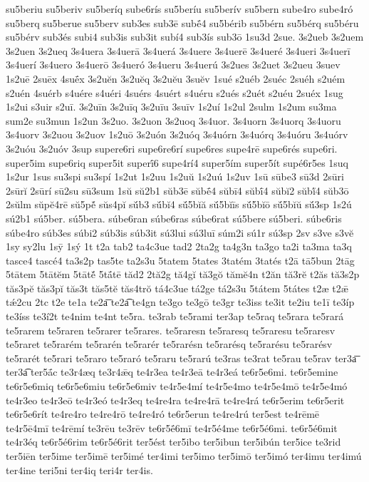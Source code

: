 {su5beriu
su5beriv
su5beríq
sube6rís
su5beríu
su5berív
su5bern
sube4ro
sube4ró
su5berq
su5berue
su5berv
sub3es
sub3ē
subḗ4
su5bérib
su5bérn
su5bérq
su5béru
su5bérv
sub3és
subi4
sub3is
sub3it
subí4
sub3ís
sub3ō
1su3d
2sue.
3s2ueb
3s2uem
3s2uen
3s2ueq
3s4uera
3s4uerā
3s4uerá
3s4uere
3s4uerē
3s4ueré
3s4ueri
3s4uerī
3s4uerí
3s4uero
3s4uerō
3s4ueró
3s4ueru
3s4uerú
3s2ues
3s2uet
3s2ueu
3suev
1s2uē
2suēx
4suḗx
3s2uĕn
3s2uĕq
3s2uĕu
3suĕv
1sué
s2uéb
2suéc
2suéh
s2uém
s2uén
4suérb
s4uére
s4uéri
4suérs
4suért
s4uéru
s2ués
s2uét
s2uéu
2suéx
1sug
1s2ui
s3uir
s2uī.
3s2uīn
3s2uīq
3s2uīu
3suīv
1s2uí
1s2ul
2sulm
1s2um
su3ma
sum2e
su3mun
1s2un
3s2uo.
3s2uon
3s2uoq
3s4uor.
3s4uorn
3s4uorq
3s4uoru
3s4uorv
3s2uou
3s2uov
1s2uō
3s2uón
3s2uóq
3s4uórn
3s4uórq
3s4uóru
3s4uórv
3s2uóu
3s2uóv
3sup
supere6ri
supe6re6rí
supe6res
supe4rē
supe6rés
supe6ri.
super5im
supe6riq
super5it
superī́6
supe4rí4
super5ím
super5ít
supé6r5es
1suq
1s2ur
1sus
su3spi
su3spí
1s2ut
1s2uu
1s2uŭ
1s2uú
1s2uv
1sū
sūbe3
sū3d
2sūri
2sūrĭ
2sūrí
sū2su
sū3sum
1sŭ
sŭ2b1
sŭb3ē
sŭbḗ4
sŭbī4
sŭbī́4
sŭbĭ2
sŭbĭ́4
sŭb3ō
2sŭlm
sŭpĕ4rē
sŭ5pĕ́
sŭs4pĭ
sŭ́b3
sŭ́bĭ4
sŭ́5bĭă
sŭ́5bĭīs
sŭ́5bĭō
sŭ́5bĭŭ
sŭ́3sp
1s2ú
sú2b1
sú5ber.
sú5bera.
súbe6ran
súbe6ras
súbe6rat
sú5bere
sú5beri.
súbe6ris
súbe4ro
súb3es
súbi2
súb3is
súb3it
sú3lui
sú3luī
súm2i
sú1r
sú3sp
2sv
s3ve
s3vĕ
1sy
sy2lu
1sȳ
1sý
1t
t2a
tab2
ta4c3ue
tad2
2ta2g
ta4g3n
ta3go
ta2i
ta3ma
ta3q
tasce4
tascé4
ta3s2p
tas5te
ta2s3u
5tatem
5tates
3tatém
3tatés
t2ā
tā5bun
2tāg
5tātem
5tātĕm
5tātĕ́
5tā́tē
tăd2
2tă2g
tă4gĭ
tă3gŏ
tămĕ4n
t2ăn
tă3rĕ
t2ăs
tă3s2p
tăs3pĕ
tăs3pĭ
tăs3t
tăs5tĕ
tăs4trŏ
tá4c3ue
tá2ge
tá2s3u
5tátem
5tátes
t2æ
t2ǣ
tǽ2cu
2tc
t2e
te1a
te2a͞
te2a͡
te4gn
te3go
te3gō
te3gr
te3iss
te3it
te2iu
te1ī
te3íp
te3íss
te3í2t
te4nim
te4nt
te5ra.
te3rab
te5rami
ter3ap
te5raq
te5rara
te5rará
te5rarem
te5raren
te5rarer
te5rares.
te5raresn
te5raresq
te5raresu
te5raresv
te5raret
te5rarém
te5rarén
te5rarér
te5rarésn
te5rarésq
te5rarésu
te5rarésv
te5rarét
te5rari
te5raro
te5raró
te5raru
te5rarú
te3ras
te3rat
te5rau
te5rav
ter3a͞
ter3a͡
ter5ā́c
te3r4æq
te3r4ǣq
te4r3ea
te4r3eā
te4r3eá
te6r5e6mi.
te6r5emine
te6r5e6miq
te6r5e6miu
te6r5e6miv
te4r5e4mí
te4r5e4mo
te4r5e4mō
te4r5e4mó
te4r3eo
te4r3eō
te4r3eó
te4r3eq
te4re4ra
te4re4rā
te4re4rá
te6r5erim
te6r5erit
te6r5e6rít
te4re4ro
te4re4rō
te4re4ró
te6r5erun
te4re4rú
ter5est
te4rēmē
te4r5ē4mī
te4rēmí
te3rēu
te3rēv
te6r5ḗ6mī
te4r5é4me
te6r5é6mi.
te6r5é6mit
te4r3éq
te6r5é6rim
te6r5é6rit
ter5ést
ter5ibo
ter5ibun
ter5ibún
ter5ice
te3rid
ter5iēn
ter5ime
ter5imē
ter5imé
ter4imi
ter5imo
ter5imō
ter5imó
ter4imu
ter4imú
ter4ine
teri5ni
ter4iq
teri4r
ter4is.
}
